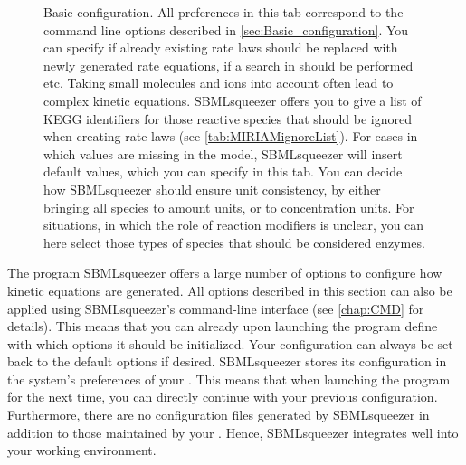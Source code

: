 \begin{figure}
\caption[Basic configuration]{Basic configuration.
All preferences %
in this tab correspond to the command line options described in
\vref{sec:Basic_configuration}. You can specify if already existing rate laws
should be replaced with newly generated rate equations, if a search in \SABIO
should be performed etc. %
Taking small molecules and ions into account often lead to complex kinetic equations.
SBMLsqueezer offers you to give a list of KEGG identifiers for those reactive
species that should be ignored when creating rate laws (see \vref{tab:MIRIAMignoreList}).
For cases in which values are missing in the
model, SBMLsqueezer will insert default values, which you can specify in this
tab. %
You can decide how SBMLsqueezer should ensure unit consistency,
by either bringing all species to amount units, or to concentration units.
For situations, in which the role of reaction modifiers is unclear, you
can here select those types of species that should be considered enzymes.}
\label{fig:Basic_Configuration}
\end{figure}
The program SBMLsqueezer offers a large number of options to configure how
kinetic equations are generated.
All options described in this section can also be applied using SBMLsqueezer's
command-line interface (see \vref{chap:CMD} for details).
This means that you can already upon launching the program define with which
options it should be initialized.
Your configuration can always be set back to the default options if desired.
SBMLsqueezer stores its configuration in the system's preferences of your \OS.
This means that when launching the program for the next time, you can directly
continue with your previous configuration.
Furthermore, there are no configuration files generated by SBMLsqueezer in
addition to those maintained by your \OS.
Hence, SBMLsqueezer integrates well into your working environment.

